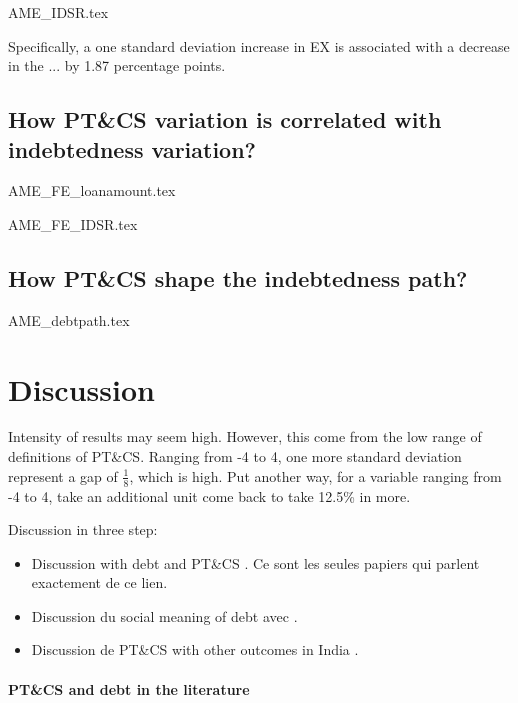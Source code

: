 \documentclass[a4paper, 11pt, onecolumn]{article}
\newcommand{\sd}{standard deviation}
\begin{document}
{AME_IDSR.tex}

Specifically, a one standard deviation increase in EX is associated with a decrease in the ... by 1.87 percentage points. 




\subsection{How PT\&CS variation is correlated with indebtedness variation?}

{AME_FE_loanamount.tex}

{AME_FE_IDSR.tex}



\subsection{How PT\&CS shape the indebtedness path?}

{AME_debtpath.tex}




\clearpage
\newpage
\section{Discussion}

Intensity of results may seem high.
However, this come from the low range of definitions of PT\&CS.
Ranging from -4 to 4, one more \sd~ represent a gap of $\frac{1}{8}$, which is high.
Put another way, for a variable ranging from -4 to 4, take an additional unit come back to take 12.5\% in more.

Discussion in three step:
\begin{itemize}
\item Discussion with debt and PT\&CS \citep{Brown2014, Forlicz2019, Nyhus2001}. Ce sont les seules papiers qui parlent exactement de ce lien.
\item Discussion du social meaning of debt avec \citep{Guerin2014a, Guerin2020}.
\item Discussion de PT\&CS with other outcomes in India \citep{Michiels2021, Dasgupta2020, Gaurav2012, Donato2017}.
\end{itemize} 

\paragraph{PT\&CS and debt in the literature}
\end{document}
